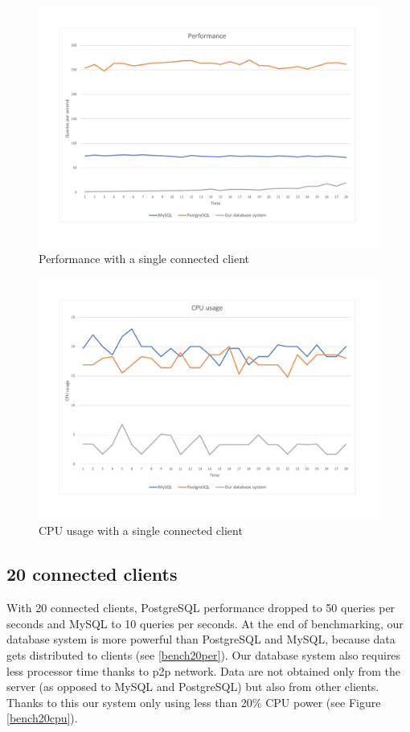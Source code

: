 \begin{figure}[H]
    \centering
    \includegraphics[width=.8\linewidth]{excel/1per.pdf}
    \caption{Performance with a single connected client}
    \label{bench1per}
\end{figure}

\begin{figure}[H]
    \centering
    \includegraphics[width=.8\linewidth]{excel/1cpu.pdf}
    \caption{CPU usage with a single connected client}
    \label{bench1cpu}
\end{figure}


\subsection{20 connected clients}
With 20 connected clients, PostgreSQL performance dropped to 50 queries per seconds and MySQL to 10 queries per seconds. At the end of benchmarking, our database system is more powerful than PostgreSQL and MySQL, because data gets distributed to clients (see \ref{bench20per}). Our database system also requires less processor time thanks to p2p network. Data are not obtained only from the server (as opposed to MySQL and PostgreSQL) but also from other clients. Thanks to this our system only using less than 20\% CPU power (see Figure \ref{bench20cpu}).

